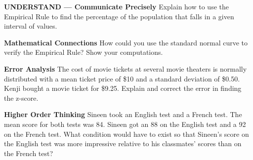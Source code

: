 \documentclass{article}
\newenvironment{practice}[2]{}{}        %
\newcommand{\answer}[1]{}               %
\newcommand{\te}[1]{}                   %
\begin{document}
\begin{practice}{7}{2}
\textbf{UNDERSTAND — Communicate Precisely} Explain how to use the Empirical Rule to find the percentage of the population that falls in a given interval of values.
\answer{Determine how many standard deviations away from the mean the endpoints of the interval are, then use the corresponding percentage from the Empirical Rule.}
\end{practice}
\begin{practice}{8}{2}
\textbf{Mathematical Connections} How could you use the standard normal curve to verify the Empirical Rule? Show your computations.
\answer{To verify the Empirical Rule for 68\%, subtract the percentile for a z-score of −1 from the percentile for a z-score of 1: ((84.1345)-(15.8655)=68.269\approx68\%). To verify it for 95\%, subtract the percentile for a z-score of −2 from the percentile for a z-score of 2: ((97.725)-(2.275)=95.45\approx95\%). To verify it for 99.7\%, subtract the percentile for a z-score of −3 from the percentile for a z-score of 3: ((99.865)-(0.135)=99.73\approx99.7\%).}
\end{practice}
\begin{practice}{9}{2}
\textbf{Error Analysis} The cost of movie tickets at several movie theaters is normally distributed with a mean ticket price of \$10 and a standard deviation of \$0.50. Kenji bought a movie ticket for \$9.25. Explain and correct the error in finding the z-score.
\te{Student work marked incorrect: (z=\frac{\text{mean}-\text{data value}}{\text{standard deviation}}); (z=\frac{\$10-\$9.25}{\$0.5}=1.5).}
\answer{Answers may vary. Sample: To find the z-score, use the formula (z=\frac{\text{data value}-\text{mean}}{\text{standard deviation}}), not (z=\frac{\text{mean}-\text{data value}}{\text{standard deviation}}). The z-score is −1.5.}
\end{practice}
\begin{practice}{10}{3}
\textbf{Higher Order Thinking} Sineen took an English test and a French test. The mean score for both tests was 84. Sineen got an 88 on the English test and a 92 on the French test. What condition would have to exist so that Sineen's score on the English test was more impressive relative to his classmates' scores than on the French test?
\answer{If the standard deviation of the scores on the English test were less than half the standard deviation of the scores on the French test, her z-score would be greater on the English test. For example, if the standard deviation of the English test scores were 2 and the standard deviation of the French test scores were 8, then Skyler's test score of 88 on the English test would be 2 standard deviations above the mean, and Skyler's test score on the French test would be 1 standard deviation above the mean.}
\te{Printed Skyler and her in the key; the prompt names Sineen and uses his.}
\end{practice}
\end{document}
